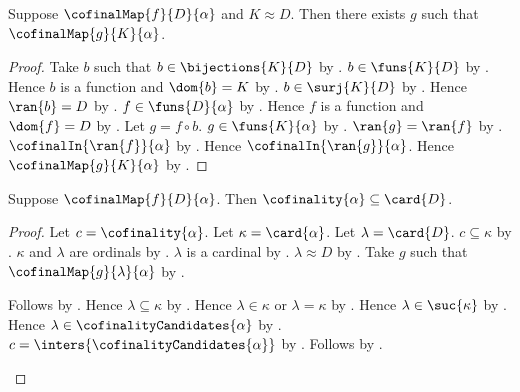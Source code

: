\begin{theorem}\label{cofinal_map_reindex}
    Suppose $\cofinalMap{f}{D}{\alpha}$ and $K\approx D$.
    Then there exists $g$ such that $\cofinalMap{g}{K}{\alpha}$.
\end{theorem}
\begin{proof}
    Take $b$ such that $b\in\bijections{K}{D}$ by .
    $b\in\funs{K}{D}$ by .
    Hence $b$ is a function and $\dom{b}=K$
        by .
    $b\in\surj{K}{D}$ by .
    Hence $\ran{b}=D$ by .
    $f\in\funs{D}{\alpha}$ by .
    Hence $f$ is a function and $\dom{f}=D$
        by .
    Let $g=f\circ b$.
    $g\in\funs{K}{\alpha}$ by .
    $\ran{g}=\ran{f}$ by .
    $\cofinalIn{\ran{f}}{\alpha}$ by .
    Hence $\cofinalIn{\ran{g}}{\alpha}$.
    Hence $\cofinalMap{g}{K}{\alpha}$ by .
\end{proof}

\begin{theorem}\label{cofinality_le_domain_card}
    Suppose $\cofinalMap{f}{D}{\alpha}$.
    Then $\cofinality{\alpha}\subseteq\card{D}$.
\end{theorem}
\begin{proof}
    Let $c=\cofinality{\alpha}$.
    Let $\kappa=\card{\alpha}$.
    Let $\lambda=\card{D}$.
    $c\subseteq\kappa$ by .
    $\kappa$ and $\lambda$ are ordinals by .
    $\lambda$ is a cardinal by .
    $\lambda\approx D$ by .
    Take $g$ such that $\cofinalMap{g}{\lambda}{\alpha}$
        by .
    \begin{byCase}
            Follows by .
            Hence $\lambda\subseteq\kappa$
                by .
            Hence $\lambda\in\kappa$ or $\lambda=\kappa$
                by .
            Hence $\lambda\in\suc{\kappa}$ by .
            Hence $\lambda\in\cofinalityCandidates{\alpha}$
                by .
            $c=\inters{\cofinalityCandidates{\alpha}}$
                by .
            Follows by .
    \end{byCase}
\end{proof}

